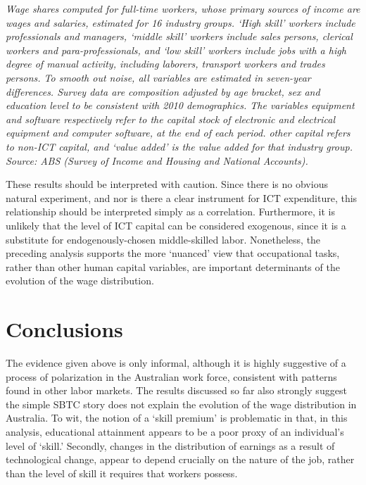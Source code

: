 \begin{table}
{\em Wage shares computed for full-time workers, whose primary sources of income are wages and salaries, estimated for 16 industry groups. `High skill' workers include professionals and managers, `middle skill' workers include sales persons, clerical workers and para-professionals, and `low skill' workers include jobs with a high degree of manual activity, including laborers, transport workers and trades persons. To smooth out noise, all variables are estimated in seven-year differences. Survey data are composition adjusted by age bracket, sex and education level to be consistent with 2010 demographics. The variables {\em equipment} and {\em software} respectively refer to the capital stock of electronic and electrical equipment and computer software, at the end of each period. {\em other capital} refers to non-ICT capital, and {\em `value added'} is the value added for that industry group. Source: ABS (Survey of Income and Housing and National Accounts).}
\end{table} 

These results should be interpreted with caution. Since there is no obvious natural experiment, and nor is there a clear instrument for ICT expenditure, this relationship should be interpreted simply as a correlation. Furthermore, it is unlikely that the level of ICT capital can be considered exogenous, since it is a substitute for endogenously-chosen middle-skilled labor. Nonetheless, the preceding analysis supports the more `nuanced' view that occupational tasks, rather than other human capital variables, are important determinants of the evolution of the wage distribution.

\section{Conclusions}

The evidence given above is only informal, although it is highly suggestive of a process of polarization in the Australian work force, consistent with patterns found in other labor markets. The results discussed so far also strongly suggest the simple SBTC story does not explain the evolution of the wage distribution in Australia. To wit, the notion of a `skill premium' is problematic in that, in this analysis, educational attainment appears to be a poor proxy of an individual's level of `skill.' Secondly, changes in the distribution of earnings as a result of technological change, appear to depend crucially on the nature of the job, rather than the level of skill it requires that workers possess.



